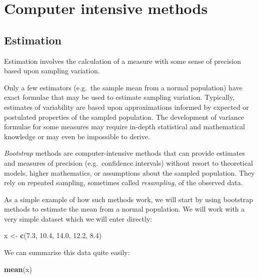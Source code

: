 \documentclass[12pt,a4paper]{book}
\newenvironment{Shaded}{\begin{snugshade}}{\end{snugshade}}
\newcommand{\FloatTok}[1]{\textcolor[rgb]{0.00,0.00,0.81}{#1}}
\newcommand{\KeywordTok}[1]{\textcolor[rgb]{0.13,0.29,0.53}{\textbf{#1}}}
\newcommand{\NormalTok}[1]{#1}
\newcommand{\StringTok}[1]{\textcolor[rgb]{0.31,0.60,0.02}{#1}}
\theoremstyle{definition}
\theoremstyle{definition}
\theoremstyle{definition}
\theoremstyle{remark}
\begin{document}
\hypertarget{exercise9}{%
\chapter{Computer intensive methods}\label{exercise9}}

\hypertarget{estimation}{%
\section{Estimation}\label{estimation}}

Estimation involves the calculation of a measure with some sense of
precision based upon sampling variation.

Only a few estimators (e.g.~the sample mean from a normal population)
have exact formulae that may be used to estimate sampling variation.
Typically, estimates of variability are based upon approximations
informed by expected or postulated properties of the sampled population.
The development of variance formulae for some measures may require
in-depth statistical and mathematical knowledge or may even be
impossible to derive.

\emph{Bootstrap} methods are computer-intensive methods that can provide
estimates and measures of precision (e.g.~confidence intervals) without
resort to theoretical models, higher mathematics, or assumptions about
the sampled population. They rely on repeated sampling, sometimes called
\emph{resampling}, of the observed data.

As a simple example of how such methods work, we will start by using
bootstrap methods to estimate the mean from a normal population. We will
work with a very simple dataset which we will enter directly:

\begin{Shaded}
\begin{Highlighting}[]
\NormalTok{x <-}\StringTok{ }\KeywordTok{c}\NormalTok{(}\FloatTok{7.3}\NormalTok{, }\FloatTok{10.4}\NormalTok{, }\FloatTok{14.0}\NormalTok{, }\FloatTok{12.2}\NormalTok{, }\FloatTok{8.4}\NormalTok{)}
\end{Highlighting}
\end{Shaded}

We can summarise this data quite easily:

\begin{Shaded}
\begin{Highlighting}[]
\KeywordTok{mean}\NormalTok{(x)}
\end{Highlighting}
\end{Shaded}
\end{document}
